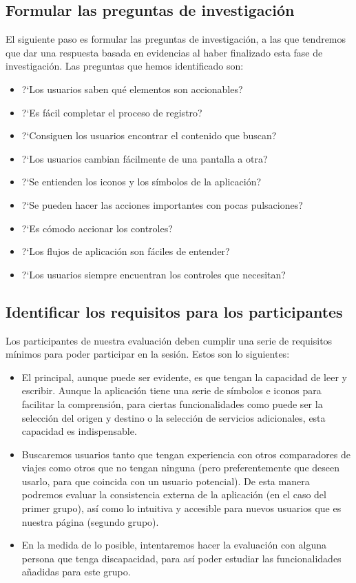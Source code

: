 \subsection{Formular las preguntas de investigación}
El siguiente paso es formular las preguntas de investigación, a las que tendremos que dar una respuesta basada en evidencias al haber finalizado esta fase de investigación.
Las preguntas que hemos identificado son:
\begin{itemize}
    \item ?`Los usuarios saben qué elementos son accionables? 
    \item ?`Es fácil completar el proceso de registro? 
    \item ?`Consiguen los usuarios encontrar el contenido que buscan?
    \item ?`Los usuarios cambian fácilmente de una pantalla a otra?
    \item ?`Se entienden los iconos y los símbolos de la aplicación? 
    \item ?`Se pueden hacer las acciones importantes con pocas pulsaciones?
    \item ?`Es cómodo accionar los controles?
    \item ?`Los flujos de aplicación son fáciles de entender?
    \item ?`Los usuarios siempre encuentran los controles que necesitan?
\end{itemize}

\subsection{Identificar los requisitos para los participantes}
Los participantes de nuestra evaluación deben cumplir una serie de requisitos mínimos para poder participar en la sesión. Estos son lo siguientes:
\begin{itemize}
    \item El principal, aunque puede ser evidente, es que tengan la capacidad de leer y escribir. Aunque la aplicación tiene una serie de símbolos e iconos para 
    facilitar la comprensión, para ciertas funcionalidades como puede ser la selección del origen y destino o la selección de servicios adicionales, esta capacidad 
    es indispensable.
    \item Buscaremos usuarios tanto que tengan experiencia con otros comparadores de viajes como otros que no tengan ninguna (pero preferentemente que deseen 
    usarlo, para que coincida con un usuario potencial). De esta manera podremos evaluar la consistencia externa de la aplicación (en el caso del primer grupo), 
    así como lo intuitiva y accesible para nuevos usuarios que es nuestra página (segundo grupo).
    \item En la medida de lo posible, intentaremos hacer la evaluación con alguna persona que tenga discapacidad, para así poder estudiar las funcionalidades 
    añadidas para este grupo.    
\end{itemize}


